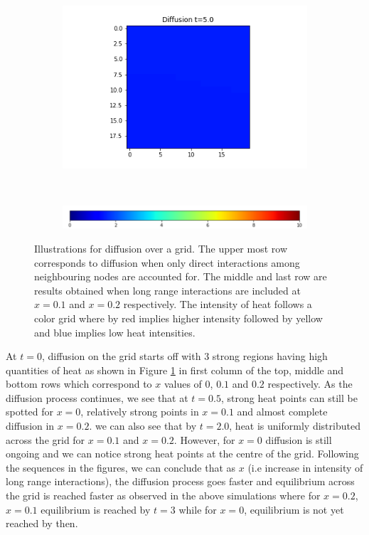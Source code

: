 \documentclass[10pt,a4paper]{article}
\begin{document}
\begin{figure}[!h]
\begin{subfigure}[b]{0.25\textwidth}
	\end{subfigure}~
	\begin{subfigure}[b]{0.25\textwidth}
		\includegraphics[width= \textwidth]{images/grid-t5-x02.png}
	\end{subfigure}\\
\vspace{0.25cm}
	 \begin{subfigure}[b]{0.60\textwidth}
	 	\includegraphics[width= \textwidth]{images/colour-bar-grid.png}
	 \end{subfigure}
\caption{Illustrations for diffusion over a grid. The upper most row corresponds to diffusion when only direct interactions among neighbouring nodes are accounted for. The middle and last row are results obtained when long range interactions are included at $x=0.1$ and $x=0.2$ respectively. The intensity of heat follows a color grid where by red implies higher intensity followed by yellow and blue implies low heat intensities.}
\label{diffusionongrid}
\end{figure}

At $t=0$, diffusion on the grid starts off with $3$ strong regions having high quantities of heat as shown in Figure \ref{diffusionongrid} in first column of the top, middle and bottom rows which correspond to $x$ values of $0$, $0.1$ and $0.2$ respectively. As the diffusion process continues, we see that at $t=0.5$, strong heat points can still be spotted for $x=0$, relatively strong points in $x=0.1$ and almost complete diffusion in $x=0.2$. we can also see that by $t=2.0$, heat is uniformly distributed across the grid for $x=0.1$ and $x=0.2$. However, for $x=0$ diffusion is still ongoing and we can notice strong heat points at the centre of the grid. Following the sequences in the figures, we can conclude that as $x$ (i.e increase in intensity of long range interactions), the diffusion process goes faster and equilibrium across the grid is reached faster as observed in the above simulations where for $x=0.2$,$x=0.1$ equilibrium is reached by $t=3$ while for $x=0$, equilibrium is not yet reached by then.

%
%
\end{document}
